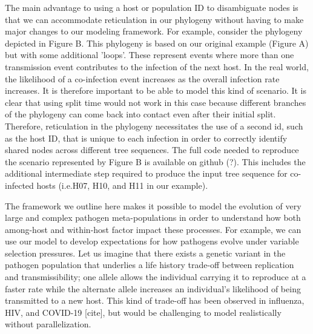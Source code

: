 \documentclass[12pt]{article}
\newcommand*{\ie}{i.e.\xcomma}
\begin{document}
The main advantage to using a host or population ID to disambiguate nodes is that we can accommodate reticulation in our phylogeny without having to make major
changes to our modeling framework. For example, consider the phylogeny depicted in Figure B. %
This phylogeny is based on our original example (Figure A) but with some
additional 'loops'. These represent events where more than one transmission event contributes to the infection of the next host. In the real world, the likelihood of a co-infection event
increases as the overall infection rate increases. It is therefore important to be able to model this kind of scenario. It is clear that using split time would not work in this case because
different branches of the phylogeny can come back into contact even after their initial split. Therefore, reticulation in the phylogeny necessitates the use of a second id, such as the host ID, that is unique to each infection in order to correctly identify shared nodes across different tree sequences. The full code needed to reproduce the scenario represented by Figure B is available on github (?). This includes the additional intermediate step required to produce the input tree sequence for co-infected hosts (\ie H07, H10, and H11 in our example). %

The framework we outline here makes it possible to model the evolution of very large and complex pathogen meta-populations in order to understand how both among-host
and within-host factor impact these processes. For example, we can use our model to develop expectations for how pathogens evolve under variable selection pressures. Let
us imagine that there exists a genetic variant in the pathogen population that underlies a life history trade-off between replication and transmissibility; one allele allows the
individual carrying it to reproduce at a faster rate while the alternate allele increases an individual's likelihood of being transmitted to a new host. This kind of trade-off has been
observed in influenza, HIV, and COVID-19 [cite], but would be challenging to model realistically without parallelization.%
\end{document}

